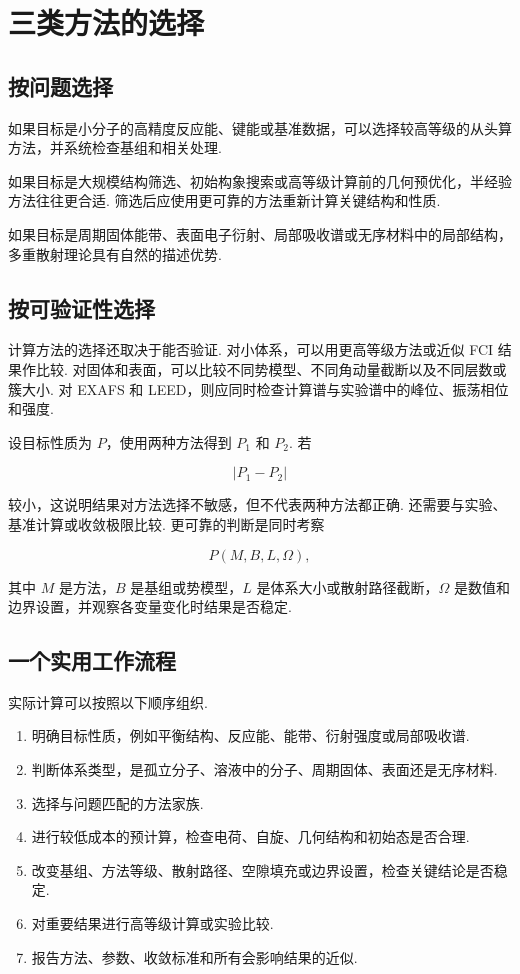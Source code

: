 \documentclass[UTF8,11pt,a4paper,openany]{ctexbook}
\begin{document}
\section{三类方法的选择}

\subsection{按问题选择}

如果目标是小分子的高精度反应能、键能或基准数据，可以选择较高等级的从头算方法，并系统检查基组和相关处理. 

如果目标是大规模结构筛选、初始构象搜索或高等级计算前的几何预优化，半经验方法往往更合适. 筛选后应使用更可靠的方法重新计算关键结构和性质. 

如果目标是周期固体能带、表面电子衍射、局部吸收谱或无序材料中的局部结构，多重散射理论具有自然的描述优势. 

\subsection{按可验证性选择}

计算方法的选择还取决于能否验证. 对小体系，可以用更高等级方法或近似 FCI 结果作比较. 对固体和表面，可以比较不同势模型、不同角动量截断以及不同层数或簇大小. 对 EXAFS 和 LEED，则应同时检查计算谱与实验谱中的峰位、振荡相位和强度. 

\begin{derivationbox}
设目标性质为 $P$，使用两种方法得到 $P_1$ 和 $P_2$. 若

\[
|P_1-P_2|
\]

较小，这说明结果对方法选择不敏感，但不代表两种方法都正确. 还需要与实验、基准计算或收敛极限比较. 更可靠的判断是同时考察

\[
P(M,B,L,\Omega),
\]

其中 $M$ 是方法，$B$ 是基组或势模型，$L$ 是体系大小或散射路径截断，$\Omega$ 是数值和边界设置，并观察各变量变化时结果是否稳定. 
\end{derivationbox}

\subsection{一个实用工作流程}

实际计算可以按照以下顺序组织. 

\begin{enumerate}
\item 明确目标性质，例如平衡结构、反应能、能带、衍射强度或局部吸收谱. 
\item 判断体系类型，是孤立分子、溶液中的分子、周期固体、表面还是无序材料. 
\item 选择与问题匹配的方法家族. 
\item 进行较低成本的预计算，检查电荷、自旋、几何结构和初始态是否合理. 
\item 改变基组、方法等级、散射路径、空隙填充或边界设置，检查关键结论是否稳定. 
\item 对重要结果进行高等级计算或实验比较. 
\item 报告方法、参数、收敛标准和所有会影响结果的近似. 
\end{enumerate}
\end{document}
